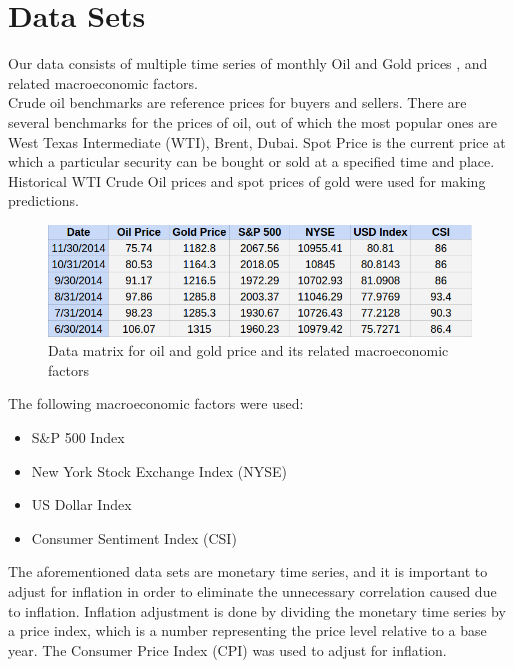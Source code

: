 \documentclass[runningheads]{llncs}
\begin{document}
\section{Data Sets}

\noindent Our data consists of multiple time series of monthly Oil and Gold prices \cite{quandal}, and related macroeconomic factors.\\

\noindent Crude oil benchmarks are reference prices for buyers and sellers. There are several benchmarks for the prices of oil, out of which the most popular ones are West Texas Intermediate (WTI), Brent, Dubai. 
Spot Price is the current price at which a particular security can be bought or sold at a specified time and place. 
Historical WTI Crude Oil prices and spot prices of gold were used for making predictions.

\begin{figure}
\centering
\includegraphics[width=\textwidth]{DataMatrices.png}
\caption{Data matrix for oil and gold price and its related macroeconomic factors}
\label{fig:DataMatrices.png}
\end{figure}

The following macroeconomic factors were used:

\begin {itemize}
\item S\&P 500 Index \cite{quandal}
\item New York Stock Exchange Index (NYSE) \cite{quandal}
\item US Dollar Index \cite{quandal}
\item Consumer Sentiment Index (CSI) \cite{csi}
\end {itemize}


\noindent The aforementioned data sets are monetary time series, and it is important to adjust for inflation in order to eliminate the unnecessary correlation caused due to inflation. Inflation adjustment is done by dividing the monetary time series by a price index, which is a number representing the price level relative to a base year. The Consumer Price Index (CPI) was used to adjust for inflation.
\end{document}
